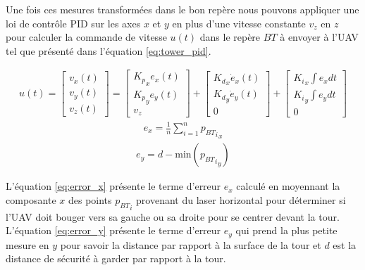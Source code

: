 Une fois ces mesures transformées dans le bon repère nous pouvons appliquer une loi de contrôle PID sur les axes $x$ et $y$ en plus d'une vitesse constante $v_z$ en $z$ pour calculer la commande de vitesse $u(t)$ dans le repère ${BT}$ à envoyer à l'UAV tel que présenté dans l'équation \ref{eq:tower_pid}.

\begin{align}
  u(t) = \begin{bmatrix}v_x(t)\\ v_y(t)\\ v_z(t)\end{bmatrix} =
  \begin{bmatrix}{K_p}_x e_x(t)\\ {K_p}_y e_y(t)\\ v_z\end{bmatrix} +
  \begin{bmatrix}{K_d}_x \dot{e}_x(t)\\ {K_d}_y \dot{e}_y(t)\\ 0\end{bmatrix} +
  \begin{bmatrix}{K_i}_x \int e_x dt\\ {K_i}_y \int e_y dt\\ 0\end{bmatrix}
  \label{eq:tower_pid}
\end{align}
\begin{align}
  e_x = \frac{1}{n} \sum_{i = 1}^n {{p_{BT}}_i}_x
  \label{eq:error_x}
\end{align}
\begin{align}
  e_y = d - {\text{min}}({{p_{BT}}_i}_y)
  \label{eq:error_y}
\end{align}

L'équation \ref{eq:error_x} présente le terme d'erreur $e_x$ calculé en moyennant la composante $x$ des points ${p_{BT}}_i$ provenant du laser horizontal pour déterminer si l'UAV doit bouger vers sa gauche ou sa droite pour se centrer devant la tour. L'équation \ref{eq:error_y} présente le terme d'erreur $e_y$ qui prend la plus petite mesure en $y$ pour savoir la distance par rapport à la surface de la tour et $d$ est la distance de sécurité à garder par rapport à la tour.

